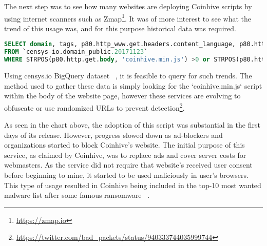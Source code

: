 The next step was to see how many websites are deploying Coinhive scripts by using internet scanners such as Zmap\footnote{\url{https://zmap.io}}. It was of more interest to see what the trend of this usage was, and for this purpose historical data was required. 
\begin{lstlisting}[caption={BigQuery SQL query to find websites using coinhive miner script using censys.io datasets},label={lst:bigquery},language=sql]
SELECT domain, tags, p80.http_www.get.headers.content_language, p80.http_www.get.headers.server, p80.http.get.headers.x_powered_by, p80.http.get.title , p80.http_www.get.body as wwwbody, p80.http.get.body as plainbody
FROM `censys-io.domain_public.20171123`
WHERE STRPOS(p80.http.get.body, 'coinhive.min.js') >0 or STRPOS(p80.http_www.get.body, 'coinhive.min.js') >0)
\end{lstlisting}

Using censys.io BigQuery dataset ~\cite{censys15}, it is feasible to query for such trends. The method used to gather these data is simply looking for the `coinhive.min.js` script within the body of the website page, however these services are evolving to obfuscate or use randomized URLs to prevent detection\footnote{\url{https://twitter.com/bad_packets/status/940333744035999744}}.

\begin{center}
	\caption{Usage of CoinHive Miner scripts in top 1 million websites over time}
\end{center}

As seen in the chart above, the adoption of this script was substantial in the first days of its release. However, progress slowed down as ad-blockers and organizations started to block Coinhive's website. The initial purpose of this service, as claimed by Coinhive, was to replace ads and cover server costs for webmasters. As the service did not require that website's received user consent before beginning to mine, it started to be used maliciously in user's browsers. This type of usage resulted in Coinhive being included in the top-10 most wanted malware list after some famous ransomware ~\cite{checkpoint}. 

\begin{center}
	\caption{Concordia University has blocked coinhive.com website}
\end{center}

